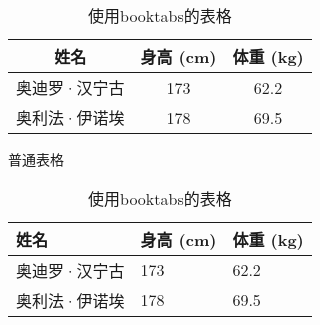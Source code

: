 \documentclass{article}
\begin{document}
\begin{table}[h]
    \begin{minipage}{0.48\linewidth}
        \centering
        \begin{tabular}{|c|c|c|} \hline
            姓名 & 身高 (cm) & 体重 (kg) \\ \hline
            奥迪罗·汉宁古  & 173 & 62.2 \\ \hline 
            奥利法·伊诺埃  & 178 & 69.5 \\ \hline   
        \end{tabular}
        \caption{普通表格}
        \label{tbl:bad_example}
    \end{minipage}
    \hfill
    \begin{minipage}{0.48\linewidth}
        \centering
        \begin{tabular}{@{}lll@{}} \toprule
            姓名 & 身高 (cm) & 体重 (kg) \\ \midrule
            奥迪罗·汉宁古  & 173 & 62.2 \\ 
            奥利法·伊诺埃  & 178 & 69.5 \\ \bottomrule   
        \end{tabular}
        \caption{使用booktabs的表格}
        \label{tbl:good_example}
    \end{minipage}
\end{table}
\end{document}
